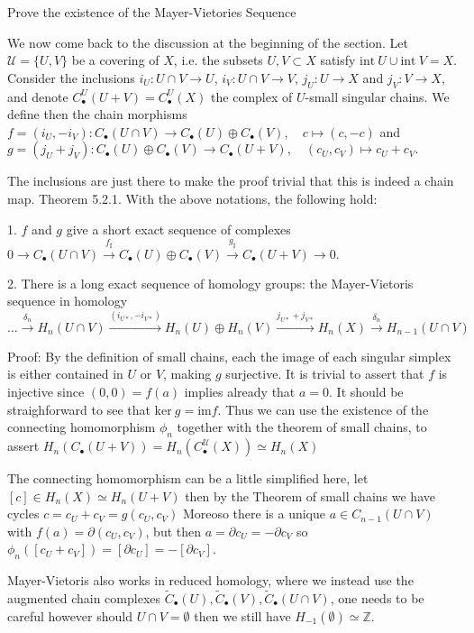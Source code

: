 Prove the existence of the Mayer-Vietories Sequence

We now come back to the discussion at the beginning of the section. Let \(\mathcal{U} = \{U, V\}\) be a covering of \(X\), i.e. the subsets \(U, V \subset X\) satisfy 
\(\text{int}\ U \cup \text{int}\ V = X\). Consider the inclusions \(i_U : U \cap V \to U\), \(i_V : U \cap V \to V\), \(j_U : U \to X\) and \(j_V : V \to X\), 
and denote \(C^{U}_\bullet(U + V) = C^{U}_\bullet(X)\) the complex of \(U\)-small singular chains. We define then the chain morphisms
\(f = (i_U, -i_V) : C_\bullet(U \cap V) \to C_\bullet(U) \oplus C_\bullet(V), \quad c \mapsto (c, -c)\)
and
\(g = (j_U + j_V) : C_\bullet(U) \oplus C_\bullet(V) \to C_\bullet(U + V), \quad (c_U, c_V) \mapsto c_U + c_V.\)

The inclusions are just there to make the proof trivial that this is indeed a chain map.
Theorem 5.2.1. With the above notations, the following hold:

1. \(f\) and \(g\) give a short exact sequence of complexes
\(0 \to C_\bullet(U \cap V) \xrightarrow{f_\sharp} C_\bullet(U) \oplus C_\bullet(V) \xrightarrow{g_\sharp} C_\bullet(U + V) \to 0.\)

2. There is a long exact sequence of homology groups: the Mayer-Vietoris sequence in homology
\(\dots \xrightarrow{\delta_n} H_n(U \cap V) \xrightarrow{(i_{U*}, -i_{V*})} H_n(U) \oplus H_n(V) \xrightarrow{j_{U*} + j_{V*}} H_n(X) \xrightarrow{\delta_n} H_{n-1}(U \cap V)\)

Proof:
By the definition of small chains, each the image of each singular simplex is either contained in \( U \) or \( V \), making \( g \) surjective.
It is trivial to assert that \( f \) is injective since \( (0, 0) = f(a) \) implies already that \( a = 0 \).
It should be straighforward to see that \( \text{ker}\ g = \text{im} f \).
Thus we can use the existence of the connecting homomorphism \( \phi_n \) together with the theorem of small chains, to assert
\( H_n(C_{\bullet}(U + V)) = H_n(C^{\mathcal{U}}_{\bullet}(X)) \simeq H_n(X) \)


The connecting homomorphism can be a little simplified here,
let \( [c] \in H_n(X) \simeq H_n(U + V) \) then by the Theorem of small chains we have cycles \( c = c_{U} + c_{V} = g(c_{U}, c_{V}) \)
Moreoso there is a unique \( a \in C_{n-1}(U \cap V) \) with \( f(a) = \partial(c_U, c_V) \), but then \( a = \partial c_U = -\partial c_V  \)
so \( \phi_n([c_U + c_V]) = [\partial c_U] = - [\partial c_V] \).

Mayer-Vietoris also works in reduced homology, where we instead use the augmented chain complexes 
\( \tilde{C}_\bullet(U), \tilde{C}_\bullet(V), \tilde{C}_\bullet(U \cap V) \),
one needs to be careful however should \( U \cap V = \emptyset \) then we still have \( H_{-1}(\emptyset) \simeq \mathbb{Z} \).


